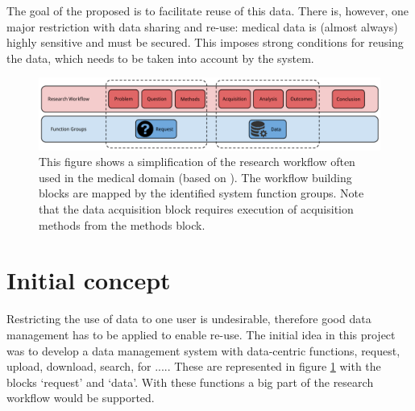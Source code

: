 The goal of the proposed \ivfsystem{} is to facilitate reuse of this data.
There is, however, one major restriction with data sharing and re-use: medical data is (almost always) highly sensitive and must be secured. 
This imposes strong conditions for reusing the data, which needs to be taken into account by the system.


\begin{figure}[ht]
	\centering
	\includegraphics[width=1.0\linewidth]{images/research-workflow}
	\caption{
		This figure shows a simplification of the research workflow often used  in the medical domain (based on \cite{nwogu}).
		The workflow building blocks are mapped by the identified system function groups. Note that the data acquisition block requires execution of acquisition methods from the methods block.
	}
	\label{fig:research-workflow}
\end{figure}

\section{Initial concept}



Restricting the use of data to one user is undesirable, therefore good data management has to be applied to enable re-use.
The initial idea in this project was to develop a data management system with data-centric functions, \eg{} request, upload, download, search, for .....
These are represented in figure \ref{fig:research-workflow} with the blocks `request' and `data'.
With these functions a big part of the research workflow would be supported.


